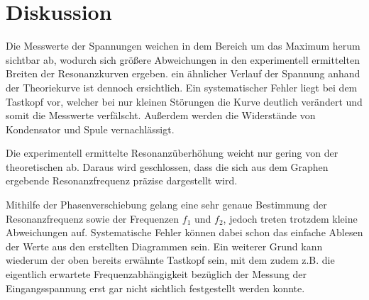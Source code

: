 \section{Diskussion}
\label{sec:Diskussion}

Die Messwerte der Spannungen weichen in dem Bereich um das Maximum herum sichtbar ab, wodurch sich größere Abweichungen
in den experimentell ermittelten Breiten der Resonanzkurven ergeben. ein ähnlicher Verlauf der Spannung anhand
der Theoriekurve ist dennoch ersichtlich.
Ein systematischer Fehler liegt bei dem Tastkopf vor,
welcher bei nur kleinen Störungen die Kurve deutlich verändert und somit die Messwerte verfälscht. Außerdem
werden die Widerstände von Kondensator und Spule vernachlässigt.


Die experimentell ermittelte Resonanzüberhöhung weicht nur gering von der theoretischen ab. Daraus wird
geschlossen, dass die sich aus dem Graphen ergebende Resonanzfrequenz präzise dargestellt wird.

Mithilfe der Phasenverschiebung gelang eine sehr genaue Bestimmung der Resonanzfrequenz sowie der Frequenzen $f_1$ und $f_2$, jedoch treten
trotzdem kleine Abweichungen auf. Systematische
Fehler können dabei schon das einfache Ablesen der Werte aus den erstellten Diagrammen sein. Ein weiterer Grund
kann wiederum der oben bereits erwähnte Tastkopf sein, mit dem zudem z.B. die eigentlich
erwartete Frequenzabhängigkeit bezüglich der Messung der Eingangsspannung erst gar nicht
sichtlich festgestellt werden konnte.
